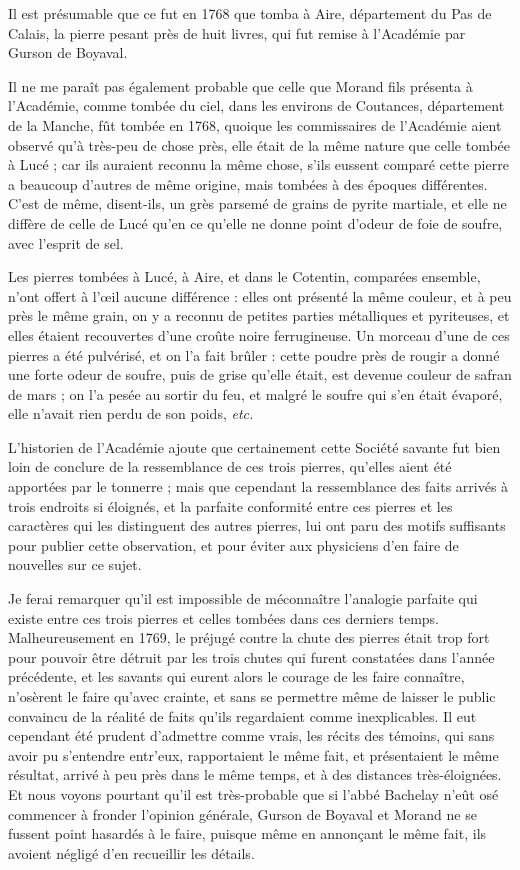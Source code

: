 \documentclass[a4paper, 12pt, oneside, french]{article}
\begin{document}
Il est présumable que ce fut en 1768 que tomba à Aire, département du Pas de Calais, la pierre pesant près de huit livres, qui fut remise à l'Académie par Gurson de Boyaval.

Il ne me paraît pas également probable que celle que Morand fils présenta à l'Académie, comme tombée du ciel, dans les environs de Coutances, département de la Manche, fût tombée en 1768, quoique les commissaires de l'Académie aient observé qu'à très-peu de chose près, elle était de la même nature que celle tombée à Lucé ; car ils auraient reconnu la même chose, s'ils eussent comparé cette pierre a beaucoup d'autres de même origine, mais tombées à des époques différentes. C'est de même, disent-ils, un grès parsemé de grains de pyrite martiale, et elle ne diffère de celle de Lucé qu'en ce qu'elle ne donne point d'odeur de foie de soufre, avec l'esprit de sel.

Les pierres tombées à Lucé, à Aire, et dans le Cotentin, comparées ensemble, n'ont offert à l'œil aucune différence : elles ont présenté la même couleur, et à peu près le même grain, on y a reconnu de petites parties métalliques et pyriteuses, et elles étaient recouvertes d'une croûte noire ferrugineuse. Un morceau d'une de ces pierres a été pulvérisé, et on l'a fait brûler : cette poudre près de rougir a donné une forte odeur de soufre, puis de grise qu'elle était, est devenue couleur de safran de mars ; on l'a pesée au sortir du feu, et malgré le soufre qui s'en était évaporé, elle n'avait rien perdu de son poids, \emph{etc.}

L'historien de l'Académie ajoute que certainement cette Société savante fut bien loin de conclure de la ressemblance de ces trois pierres, qu'elles aient été apportées par le tonnerre ; mais que cependant la ressemblance des faits arrivés à trois endroits si éloignés, et la parfaite conformité entre ces pierres et les caractères qui les distinguent des autres pierres, lui ont paru des motifs suffisants pour publier cette observation, et pour éviter aux physiciens d'en faire de nouvelles sur ce sujet.

Je ferai remarquer qu'il est impossible de méconnaître l'analogie parfaite qui existe entre ces trois pierres et celles tombées dans ces derniers temps. Malheureusement en 1769, le préjugé contre la chute des pierres était trop fort pour pouvoir être détruit par les trois chutes qui furent constatées dans l'année précédente, et les savants qui eurent alors le courage de les faire connaître, n'osèrent le faire qu'avec crainte, et sans se permettre même de laisser le public convaincu de la réalité de faits qu'ils regardaient comme inexplicables. Il eut cependant été prudent d'admettre comme vrais, les récits des témoins, qui sans avoir pu s'entendre entr'eux, rapportaient le même fait, et présentaient le même résultat, arrivé à peu près dans le même temps, et à des distances très-éloignées. Et nous voyons pourtant qu'il est très-probable que si l'abbé Bachelay n'eût osé commencer à fronder l'opinion générale, Gurson de Boyaval et Morand ne se fussent point hasardés à le faire, puisque même en annonçant le même fait, ils avoient négligé d'en recueillir les détails.
\end{document}
